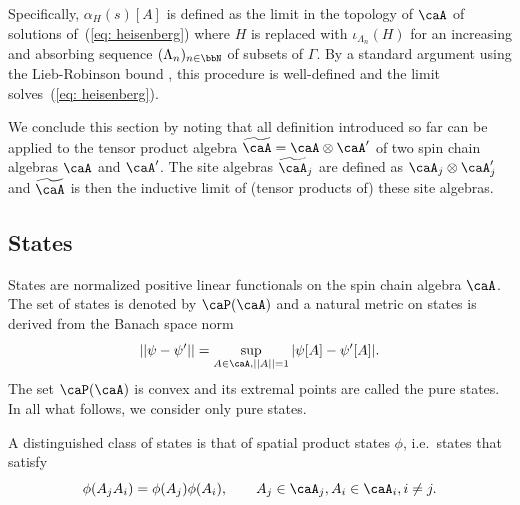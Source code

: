 Specifically, $\alpha_H(s)[A]$ is defined as the limit in the topology of $\caA$ of solutions of~(\ref{eq: heisenberg}) where $H$ is replaced with $\iota_{\Lambda_n}(H)$ for an increasing and absorbing sequence $(\Lambda_n)_{n\in\bbN}$ of subsets of $\Gamma$. By a standard argument using the Lieb-Robinson bound \cite{Lieb:1972ts,nachtergaele2006propagation}, this procedure is well-defined and the limit solves~(\ref{eq: heisenberg}). 


We conclude this section by noting that all definition introduced so far can be applied to the tensor product algebra $\widetilde \caA= \caA \otimes  \caA'$ of two spin chain algebras $\caA$ and $\caA'$. The site algebras $\widetilde \caA_j$ are defined as $\caA_j\otimes\caA'_j$ and $\widetilde\caA$ is then the inductive limit of (tensor products of) these site algebras.


\subsection{States}\label{sec: states}

States are normalized positive linear functionals on the spin chain algebra $\caA$. The set of states is denoted by $\caP(\caA)$ and a natural metric on states is derived from the Banach space norm
\begin{equation}\label{eq: metric on states}
	||\psi-\psi'|| = \sup_{A \in\caA, ||A||=1} |\psi[A]-\psi'[A]|.
\end{equation}
The set $\caP(\caA)$ is convex and its extremal points are called the pure states. In all what follows, we consider only pure states.

A distinguished class of states is that of spatial product states $\phi$, i.e.\ states that satisfy
$$
\phi(A_jA_i)= \phi(A_j)\phi( A_i),\qquad  A_j \in\caA_j,A_i\in \caA_i, i\neq j.
$$  
%
%
%

